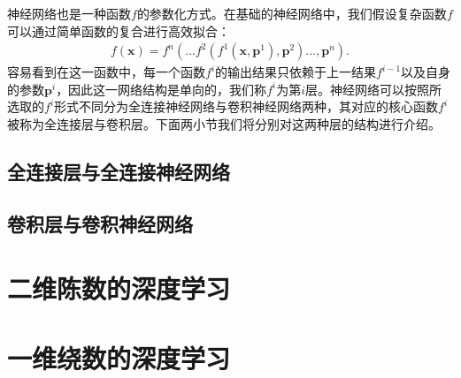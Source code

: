 神经网络也是一种函数$f$的参数化方式。在基础的神经网络中，我们假设复杂函数$f$可以通过简单函数的复合进行高效拟合：
\begin{align}
f(\mathbf{x})=f^n(...f^2(f^1(\mathbf{x},\mathbf{p}^1),\mathbf{p}^2)...,\mathbf{p}^n).
\end{align}
容易看到在这一函数中，每一个函数$f^i$的输出结果只依赖于上一结果$f^{i-1}$以及自身的参数$\mathbf{p}^i$，因此这一网络结构是单向的，我们称$f^i$为第$i$层。神经网络可以按照所选取的$f^i$形式不同分为全连接神经网络与卷积神经网络两种，其对应的核心函数$f^i$被称为全连接层与卷积层。下面两小节我们将分别对这两种层的结构进行介绍。


\subsection{全连接层与全连接神经网络}

\subsection{卷积层与卷积神经网络}



\section{二维陈数的深度学习}


\section{一维绕数的深度学习}

